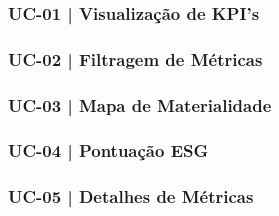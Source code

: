 
\subsubsection{UC-01 | Visualização de KPI's}


\subsubsection{UC-02 | Filtragem de Métricas}


\subsubsection{UC-03 | Mapa de Materialidade}


\subsubsection{UC-04 | Pontuação ESG}


\subsubsection{UC-05 | Detalhes de Métricas}

